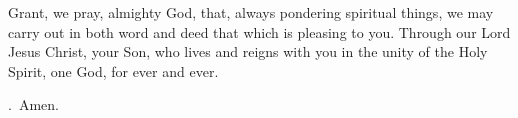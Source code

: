 \lettrine[lines=3]{G}{}rant, we pray, almighty God,
that, always pondering spiritual things,
we may carry out in both word and deed
that which is pleasing to you.
Through our Lord Jesus Christ, your Son,
who lives and reigns with you in the unity of the Holy Spirit,
one God, for ever and ever. \par \Rbar.~Amen.
